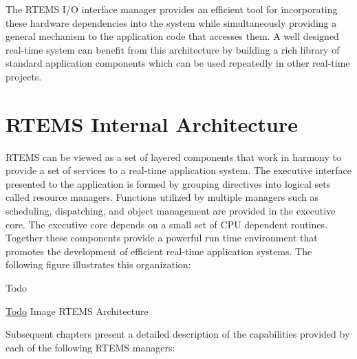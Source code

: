The R\+T\+E\+MS I/O interface manager provides an efficient tool for incorporating these hardware dependencies into the system while simultaneously providing a general mechanism to the application code that accesses them. A well designed real-\/time system can benefit from this architecture by building a rich library of standard application components which can be used repeatedly in other real-\/time projects.\hypertarget{RTEMSOverview_RTEMSOverviewSecInternalArchitecture}{}\section{R\+T\+E\+M\+S Internal Architecture}\label{RTEMSOverview_RTEMSOverviewSecInternalArchitecture}
R\+T\+E\+MS can be viewed as a set of layered components that work in harmony to provide a set of services to a real-\/time application system. The executive interface presented to the application is formed by grouping directives into logical sets called resource managers. Functions utilized by multiple managers such as scheduling, dispatching, and object management are provided in the executive core. The executive core depends on a small set of C\+PU dependent routines. Together these components provide a powerful run time environment that promotes the development of efficient real-\/time application systems. The following figure illustrates this organization\+:

\begin{DoxyRefDesc}{Todo}
\item[\mbox{\hyperlink{todo__todo000004}{Todo}}]Image R\+T\+E\+MS Architecture\end{DoxyRefDesc}


Subsequent chapters present a detailed description of the capabilities provided by each of the following R\+T\+E\+MS managers\+:


